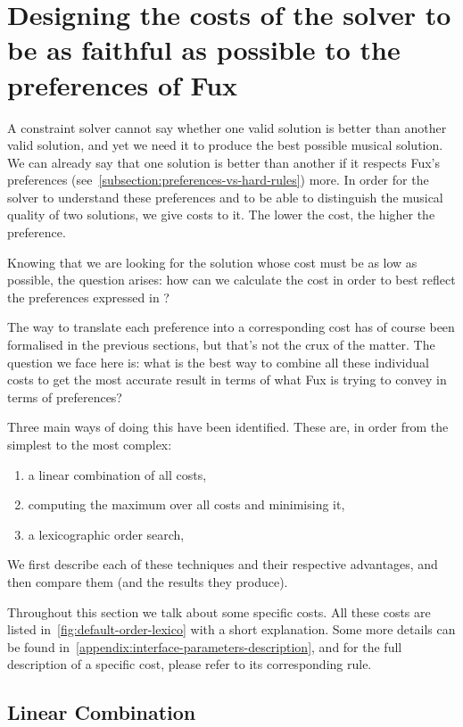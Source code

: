 \section{Designing the costs of the solver to be as faithful as possible to the preferences of Fux} \label{costs}
A constraint solver cannot say whether one valid solution is better than another valid solution, and yet we need it to produce the best possible musical solution. We can already say that one solution is better than another if it respects Fux's preferences (see~\ref{subsection:preferences-vs-hard-rules}) more. In order for the solver to understand these preferences and to be able to distinguish the musical quality of two solutions, we give costs to it.  The lower the cost, the higher the preference.

Knowing that we are looking for the solution whose cost must be as low as possible, the question arises: how can we calculate the cost in order to best reflect the preferences expressed in \gap?

The way to translate each preference into a corresponding cost has of course been formalised in the previous sections, but that's not the crux of the matter. The question we face here is: what is the best way to combine all these individual costs to get the most accurate result in terms of what Fux is trying to convey in terms of preferences?

Three main ways of doing this have been identified. These are, in order from the simplest to the most complex:
\begin{enumerate}
    \item a linear combination of all costs,
    \item computing the maximum over all costs and minimising it,
    \item a lexicographic order search, 
\end{enumerate}
We first describe each of these techniques and their respective advantages, and then compare them (and the results they produce).

Throughout this section we talk about some specific costs. All these costs are listed in~\ref{fig:default-order-lexico} with a short explanation. Some more details can be found in~\ref{appendix:interface-parameters-description}, and for the full description of a specific cost, please refer to its corresponding rule. 


\subsection{Linear Combination}



